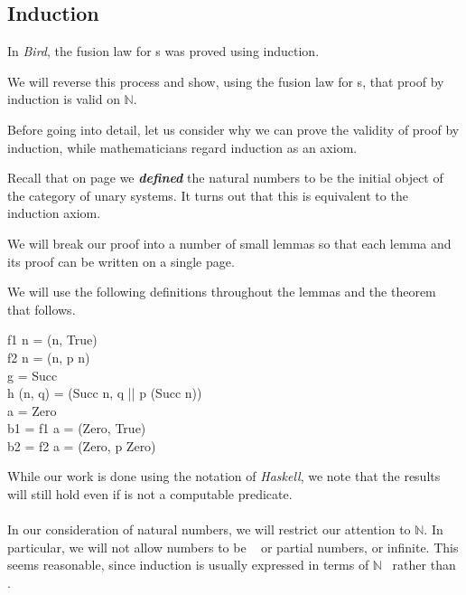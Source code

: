 \documentclass{seminar}
\newcommand{\NAT}{\textcolor{MathColor}{\ensuremath{\mathbb{N}}}}
\begin{document}
\begin{slide}
\newpage

\subsection{Induction}

In \textit{Bird}, the fusion law for s was proved using induction.

We will reverse this process and show, using the fusion law for s,
that proof by induction is valid on \NAT.

Before going into detail, let us consider why we can prove the validity
of proof by induction, while mathematicians regard induction as an axiom.

Recall that on
page \pageref{p-not-induction} we
\textbf{\textit{defined}} the natural numbers to
be the initial object of the category of unary systems.  It turns out that this
is equivalent to the induction axiom.

\newpage

We will break our proof into a number of small lemmas so that each lemma
and its proof can be written on a single page.

We will use the following definitions throughout the lemmas and
the theorem that follows.

\begin{code}
f1 n     = (n, True)\\
f2 n     = (n, p n)\\
g        = Succ\\
h (n, q) = (Succ n, q || p (Succ n))\\
a        = Zero\\
b1       = f1 a = (Zero, True)\\
b2       = f2 a = (Zero, p Zero)
\end{code}

While our work is done using the notation of \textit{Haskell}, we note that the
results will still hold even if  is not a computable predicate.

\newpage

\paragraph{}
In our consideration of natural numbers, we will restrict our attention
to \NAT.  In particular, we
will not allow numbers to be \bottom ~ or partial numbers, or
infinite.  This seems
reasonable, since induction is usually expressed in terms of \NAT ~ rather
than .


\end{slide}
\end{document}

